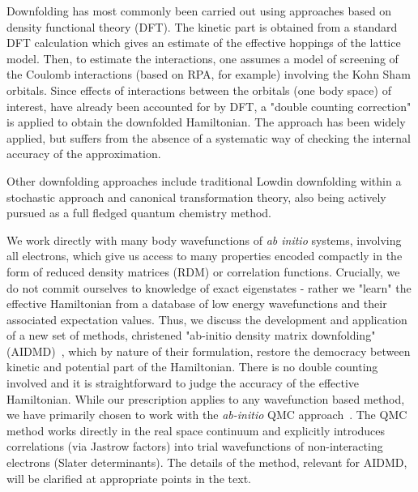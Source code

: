 \documentclass[prl,12pt,onecolumn,nofootinbib,notitlepage,english,superscriptaddress]{revtex4-1}
\begin{document}
Downfolding has most commonly been carried out using approaches based on density functional theory (DFT). 
The kinetic part is obtained from a standard 
DFT calculation which gives an estimate of the effective hoppings of the lattice model. 
Then, to estimate the interactions, one assumes a model of screening of the Coulomb interactions 
(based on RPA, for example) involving the Kohn Sham orbitals. Since effects of interactions 
between the orbitals (one body space) of interest, have already been accounted for by DFT, a 
"double counting correction" is applied to obtain the downfolded Hamiltonian. 
The approach has been widely applied, but suffers from the absence of a systematic way of checking 
the internal accuracy of the approximation.

Other downfolding approaches include traditional Lowdin downfolding 
within a stochastic approach and canonical transformation theory, 
also being actively pursued as a full fledged quantum chemistry method. 

We work directly with many body wavefunctions of \emph{ab initio} systems, involving all electrons, 
which give us access to many properties encoded compactly in the form of reduced 
density matrices (RDM) or correlation functions. Crucially, we do not commit ourselves to 
knowledge of exact eigenstates - rather we "learn" the effective Hamiltonian from a database of 
low energy wavefunctions and their associated expectation values. 
Thus, we discuss the development and application 
of a new set of methods, christened "ab-initio density matrix downfolding" (AIDMD)~\cite{Changlani2015},
which by nature of their formulation, restore the democracy between kinetic and 
potential part of the Hamiltonian. There is no double counting involved and it is straightforward 
to judge the accuracy of the effective Hamiltonian. While our prescription applies to any wavefunction based method, 
we have primarily chosen to work with the \emph{ab-initio} QMC approach~\cite{Ceperley_Alder,Foulkes_review}. 
The QMC method works directly in the real space continuum and explicitly introduces correlations (via Jastrow factors) 
into trial wavefunctions of non-interacting electrons (Slater determinants). 
The details of the method, relevant for AIDMD, will be clarified at appropriate points 
in the text. 
\end{document}
